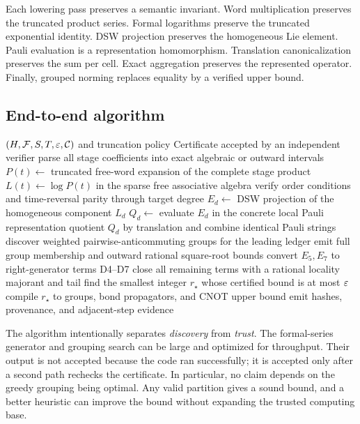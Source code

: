 Each lowering pass preserves a semantic invariant.  Word multiplication
preserves the truncated product series.  Formal logarithms preserve the
truncated exponential identity.  DSW projection preserves the homogeneous
Lie element.  Pauli evaluation is a representation homomorphism.  Translation
canonicalization preserves the sum per cell.  Exact aggregation preserves the
represented operator.  Finally, grouped norming replaces equality by a
verified upper bound.

\subsection{End-to-end algorithm}

\begin{algorithm}[t]
\caption{Compile a product formula into a resource certificate}
\label{alg:compiler}
\begin{algorithmic}[1]
\Require $(H,\mathcal F,S,T,\varepsilon,\mathcal C)$ and truncation policy
\Ensure Certificate accepted by an independent verifier
\State parse all stage coefficients into exact algebraic or outward intervals
\State $P(t)\gets$ truncated free-word expansion of the complete stage product
\State $L(t)\gets\log P(t)$ in the sparse free associative algebra
\State verify order conditions and time-reversal parity through target degree
  \State $E_d\gets$ DSW projection of the homogeneous component $L_d$
  \State $Q_d\gets$ evaluate $E_d$ in the concrete local Pauli representation
  \State quotient $Q_d$ by translation and combine identical Pauli strings
\EndFor
\State discover weighted pairwise-anticommuting groups for the leading ledger
\State emit full group membership and outward rational square-root bounds
\State convert $E_5,E_7$ to right-generator terms D4--D7
\State close all remaining terms with a rational locality majorant and tail
\State find the smallest integer $r_\star$ whose certified bound is at most $\varepsilon$
\State compile $r_\star$ to groups, bond propagators, and CNOT upper bound
\State emit hashes, provenance, and adjacent-step evidence
\end{algorithmic}
\end{algorithm}

The algorithm intentionally separates \emph{discovery} from \emph{trust}.
The formal-series generator and grouping search can be large and optimized for
throughput.  Their output is not accepted because the code ran successfully;
it is accepted only after a second path rechecks the certificate.  In
particular, no claim depends on the greedy grouping being optimal.  Any valid
partition gives a sound bound, and a better heuristic can improve the bound
without expanding the trusted computing base.

